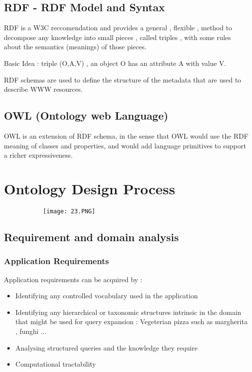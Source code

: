 \documentclass{article}
\begin{document}
\subsection{RDF - RDF Model and Syntax}

RDF is a W3C reccomendation and provides a general , flexible , method to decompose any knowledge into small pieces , called triples , with some rules about the semantics (meanings) of those pieces.

Basic Idea : triple (O,A,V) , an object O has an attribute A with value V.

RDF schemas are used to define the structure of the metadata that are used to describe WWW resources.

\subsection{OWL (Ontology web Language)}
OWL is an extension of RDF schema, in the sense that OWL would use the RDF meaning of classes and properties, and would add language primitives to support a richer expressiveness.



\section{Ontology Design Process}



\begin{figure}[ht!]
  \centering
  \begin{subfigure}[b]{0.9\linewidth}
    \texttt{[image: 23.PNG]}
  \end{subfigure}
\end{figure}

\subsection{Requirement and domain analysis}

\subsubsection{Application Requirements}

Application requirements can be acquired by :

\begin{itemize}
    \item Identifying any controlled vocabulary used in the application
    \item Identifying any hierarchical or taxonomic structures intrinsic in the domain that might be used for query expansion : Vegeterian pizza such as margherita , funghi ...
    \item Analysing structured queries and the knowledge they require 
    \item Computational tractability
\end{itemize}
\end{document}

